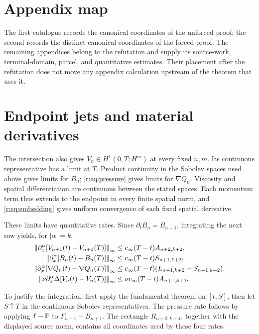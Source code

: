 \section*{Appendix map}
The first catalogue records the canonical coordinates of the unforced proof;
the second records the distinct canonical coordinates of the forced proof.
The remaining appendices belong to the refutation and supply its source-work,
terminal-domain, parcel, and quantitative estimates.  Their placement after
the refutation does not move any appendix calculation upstream of the theorem
that uses it.

\UnforcedQuantitativeCatalogue
\ForcedQuantitativeCatalogue











\section{Endpoint jets and material derivatives}\label{r:app:endpoint}

The intersection also gives \(V_n\in H^1(0,T;H^m)\) at every fixed
\(n,m\). Its continuous representative has a limit at \(T\).
Product continuity in the Sobolev spaces used above gives limits for \(B_n\);
\eqref{r:eq:pressure} gives limits for \(\nabla Q_n\). Viscosity and
spatial differentiation are continuous between the stated spaces. Each
momentum term thus extends to the endpoint in every finite spatial norm,
and \eqref{r:eq:embedding} gives uniform convergence of each fixed spatial
derivative.

\begin{samepage}
These limits have quantitative rates. Since
\(\partial_t B_n=B_{n+1}\), integrating the next row yields, for
\(|\alpha|=k\),
\begin{align}
 \left\lVert \partial_x^\alpha[V_{n+1}(t)-V_{n+1}(T)]\right\rVert_\infty
 &\le c_\infty(T-t)A_{n+2,k+2},\label{r:eq:rate-time}\\
 \left\lVert \partial_x^\alpha[B_n(t)-B_n(T)]\right\rVert_\infty
 &\le c_\infty(T-t)S_{n+1,k+2},\label{r:eq:rate-transport}\\
 \left\lVert \partial_x^\alpha[\nabla Q_n(t)-\nabla Q_n(T)]\right\rVert_\infty
 &\le c_\infty(T-t)(L_{n+1,k+2}+S_{n+1,k+2}),\label{r:eq:rate-pressure}\\
 \left\lVert \nu\partial_x^\alpha\Delta[V_n(t)-V_n(T)]\right\rVert_\infty
 &\le\nu c_\infty(T-t)A_{n+1,k+4}.\label{r:eq:rate-viscosity}
\end{align}
\end{samepage}
To justify the integration, first apply the fundamental theorem on
\([t,S]\), then let \(S\uparrow T\) in the continuous Sobolev
representatives. The pressure rate follows by applying \(I-\mathbb P\) to
\(F_{n+1}-B_{n+1}\). The rectangle \(R_{n+2,k+4}\), together with the
displayed source norm, contains all coordinates used by these four rates.

